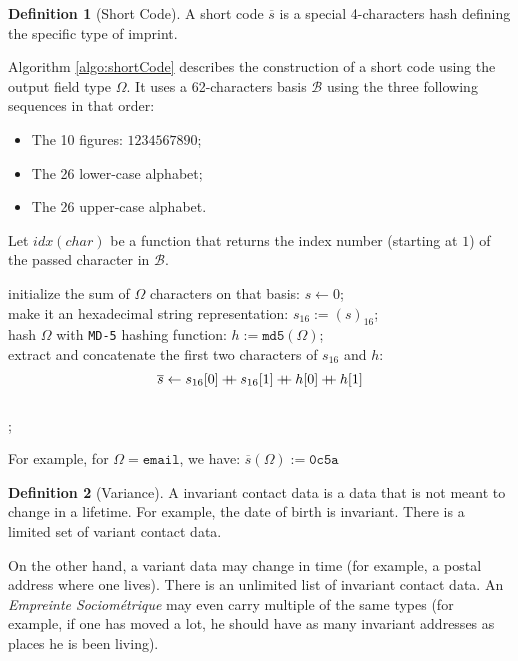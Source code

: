 \documentclass[twoside,twocolumn]{article}
\newcommand{\concat}{\mathbin{{+}\mspace{-8mu}{+}}}
\newcommand{\norm}[1]{\left\Vert#1\right\Vert}
\theoremstyle{definition}
\newtheorem{definition}{Definition}
\theoremstyle{remark}
\begin{document}
\begin{definition}[Short Code]
    \label{shortCode}
    A short code $\overline{s}$ is a special 4-characters hash defining the specific type of imprint.

    Algorithm \ref{algo:shortCode} describes the construction of a short code using the output field type $\Omega$.
    It uses a 62-characters basis $\mathcal{B}$ using the three following sequences in that order:
    \begin{itemize}
        \item The 10 figures: $1234567890$;
        \item The 26 lower-case alphabet;
        \item The 26 upper-case alphabet.
    \end{itemize}

    Let $idx(char)$ be a function that returns the index number (starting at $1$) of the passed character in $\mathcal{B}$.
    \begin{algorithm}
        \KwIn{$\Omega$}
        initialize the sum of $\Omega$ characters on that basis: $s \gets 0$; \\
        \For{$i \gets 1$ \KwTo $\norm{\Omega}$}{
            $s \gets s + idx(\Omega_i)$;
        }
        make it an hexadecimal string representation: $s_{16} := (s)_{16}$; \\
        hash $\Omega$ with \texttt{MD-5} hashing function: $h := \texttt{md5}(\Omega)$; \\
        extract and concatenate the first two characters of $s_{16}$ and $h$: $$
            \overline{s} \gets s_{16}[0] \concat s_{16}[1] \concat h[0] \concat h[1]
        $$ \\
        ;
        \caption{Short code $\overline{s}$}
        \label{algo:shortCode}
    \end{algorithm}
    
    For example, for $\Omega = \texttt{email}$, we have: $\overline{s}(\Omega) := \texttt{0c5a}$
\end{definition}

\begin{definition}[Variance]
    \label{variantInvariant}
    A invariant contact data is a data that is not meant to change in a lifetime.
    For example, the date of birth is invariant.
    There is a limited set of variant contact data.

    On the other hand, a variant data may change in time (for example, a postal address where one lives).
    There is an unlimited list of invariant contact data. An \emph{Empreinte Sociométrique} may even carry multiple of the same types (for example, 
    if one has moved a lot, he should have as many invariant addresses as places he is been living).
\end{definition}
\end{document}
